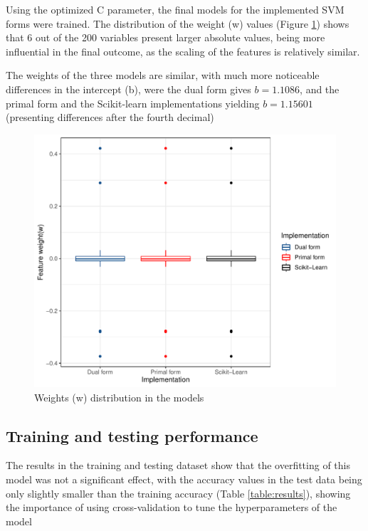 \documentclass[11pt,twocolumn,letterpaper]{article}
\begin{document}
Using the optimized C parameter, the final models for the implemented SVM forms were trained. The distribution of the weight (w) values (Figure \ref{fig:weights}) shows that 6 out of the 200 variables present larger absolute values, being more influential in the final outcome, as the scaling of the features is relatively similar.

The weights of the three models are similar, with much more noticeable differences in the intercept (b), were the dual form gives $b = 1.1086$, and the primal form and the Scikit-learn implementations yielding $b=1.15601$ (presenting differences after the fourth decimal)

\begin{figure}[h]
	\begin{center}
		\includegraphics[width=1.0\linewidth]{weights.pdf}
	\end{center}
	\caption{Weights (w) distribution in the models}
	\label{fig:weights}
\end{figure}

\subsection{Training and testing performance}

The results in the training and testing dataset show that the overfitting of this model was not a significant effect, with the accuracy values in the test data being only slightly smaller than the training accuracy (Table \ref{table:results}), showing the importance of using cross-validation to tune the hyperparameters of the model
\end{document}
